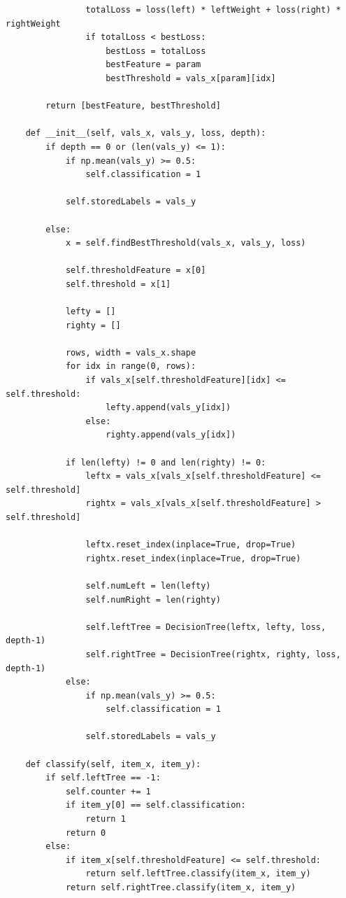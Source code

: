 \documentclass{article}
\begin{document}
\begin{titlepage}
\begin{lstlisting}
                totalLoss = loss(left) * leftWeight + loss(right) * rightWeight
                if totalLoss < bestLoss:
                    bestLoss = totalLoss
                    bestFeature = param
                    bestThreshold = vals_x[param][idx]

        return [bestFeature, bestThreshold]

    def __init__(self, vals_x, vals_y, loss, depth):
        if depth == 0 or (len(vals_y) <= 1):
            if np.mean(vals_y) >= 0.5:
                self.classification = 1

            self.storedLabels = vals_y

        else:
            x = self.findBestThreshold(vals_x, vals_y, loss)

            self.thresholdFeature = x[0]
            self.threshold = x[1]

            lefty = []
            righty = []

            rows, width = vals_x.shape
            for idx in range(0, rows):
                if vals_x[self.thresholdFeature][idx] <= self.threshold:
                    lefty.append(vals_y[idx])
                else:
                    righty.append(vals_y[idx])

            if len(lefty) != 0 and len(righty) != 0:
                leftx = vals_x[vals_x[self.thresholdFeature] <= self.threshold]
                rightx = vals_x[vals_x[self.thresholdFeature] > self.threshold]

                leftx.reset_index(inplace=True, drop=True)
                rightx.reset_index(inplace=True, drop=True)

                self.numLeft = len(lefty)
                self.numRight = len(righty)

                self.leftTree = DecisionTree(leftx, lefty, loss, depth-1)
                self.rightTree = DecisionTree(rightx, righty, loss, depth-1)
            else:
                if np.mean(vals_y) >= 0.5:
                    self.classification = 1

                self.storedLabels = vals_y

    def classify(self, item_x, item_y):
        if self.leftTree == -1:
            self.counter += 1
            if item_y[0] == self.classification:
                return 1
            return 0
        else:
            if item_x[self.thresholdFeature] <= self.threshold:
                return self.leftTree.classify(item_x, item_y)
            return self.rightTree.classify(item_x, item_y)



\end{lstlisting}
\end{titlepage}
\end{document}
